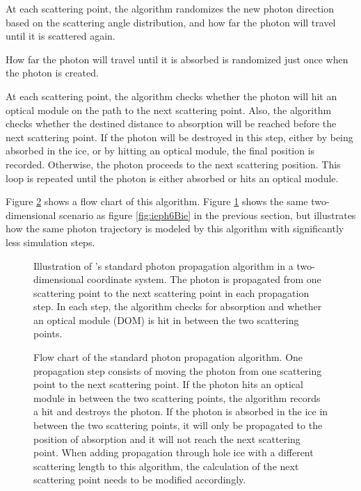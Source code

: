 At each scattering point, the algorithm randomizes the new photon direction based on the scattering angle distribution, and how far the photon will travel until it is scattered again.

How far the photon will travel until it is absorbed is randomized just once when the photon is created.

At each scattering point, the algorithm checks whether the photon will hit an optical module on the path to the next scattering point. Also, the algorithm checks whether the destined distance to absorption will be reached before the next scattering point. If the photon will be destroyed in this step, either by being absorbed in the ice, or by hitting an optical module, the final position is recorded. Otherwise, the photon proceeds to the next scattering position. This loop is repeated until the photon is either absorbed or hits an optical module. \cite{ppcpaper}

Figure \ref{fig:Ar0vai8u} shows a flow chart of this algorithm. Figure \ref{fig:oheeL3ai} shows the same two-dimensional scenario as figure \ref{fig:ieph6Bie} in the previous section, but illustrates how the same photon trajectory is modeled by this algorithm with significantly less simulation steps.

\begin{figure}[htbp]
  \caption{Illustration of \icecube's standard photon propagation algorithm in a two-dimensional coordinate system. The photon is propagated from one scattering point to the next scattering point in each propagation step. In each step, the algorithm checks for absorption and whether an optical module (DOM) is hit in between the two scattering points.}
  \label{fig:oheeL3ai}
\end{figure}

\begin{figure}[p]
  \caption{Flow chart of the standard photon propagation algorithm. One propagation step consists of moving the photon from one scattering point to the next scattering point. If the photon hits an optical module in between the two scattering points, the algorithm records a hit and destroys the photon. If the photon is absorbed in the ice in between the two scattering points, it will only be propagated to the position of absorption and it will not reach the next scattering point. When adding propagation through hole ice with a different scattering length to this algorithm, the calculation of the next scattering point needs to be modified accordingly.}
  \label{fig:Ar0vai8u}
\end{figure}

